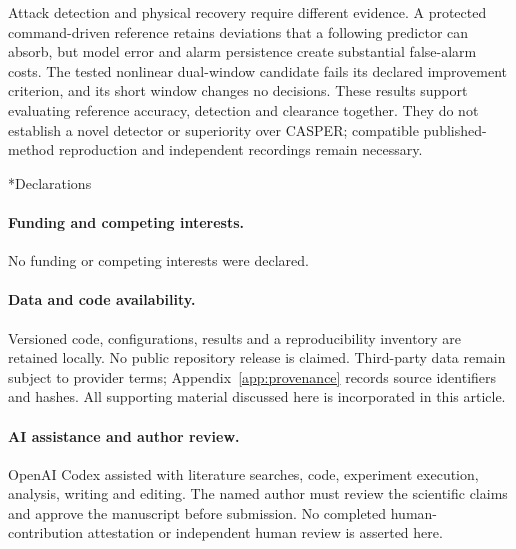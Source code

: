 \documentclass[11pt,twocolumn]{article}
\makeatletter
\renewcommand\section{\@startsection{section}{1}{\z@}{-2.5ex plus -1ex minus -.2ex}{1.2ex plus .2ex}{\normalfont\large\bfseries\raggedright}}
\makeatother
\begin{document}
Attack detection and physical recovery require different evidence. A protected command-driven reference retains deviations that a following predictor can absorb, but model error and alarm persistence create substantial false-alarm costs. The tested nonlinear dual-window candidate fails its declared improvement criterion, and its short window changes no decisions. These results support evaluating reference accuracy, detection and clearance together. They do not establish a novel detector or superiority over CASPER; compatible published-method reproduction and independent recordings remain necessary.


\section*{Declarations}
\paragraph{Funding and competing interests.} No funding or competing interests were declared.
\paragraph{Data and code availability.} Versioned code, configurations, results and a reproducibility inventory are retained locally. No public repository release is claimed. Third-party data remain subject to provider terms; Appendix~\ref{app:provenance} records source identifiers and hashes. All supporting material discussed here is incorporated in this article.
\paragraph{AI assistance and author review.} OpenAI Codex assisted with literature searches, code, experiment execution, analysis, writing and editing. The named author must review the scientific claims and approve the manuscript before submission. No completed human-contribution attestation or independent human review is asserted here.
\appendix



\begingroup\raggedright

\endgroup
\end{document}

